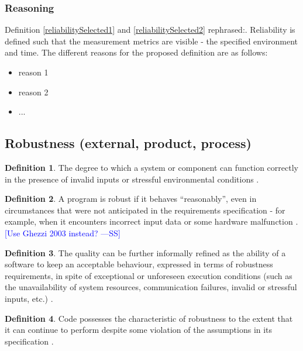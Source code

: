 \documentclass[letterpaper, cleveref]{lipics-v2019}
\newcommand{\authornote}[3]{\textcolor{#1}{[#3 ---#2]}}
\newcommand{\authornote}[3]{}
\newcommand{\wss}[1]{\authornote{blue}{SS}{#1}} %
\newcommand{\pmi}[1]{\authornote{green}{PM}{#1}} %
\theoremstyle{definition}
\newtheorem{defn}{Definition}
\begin{document}
\subsubsection*{Reasoning}

Definition \ref{reliabilitySelected1} and \ref{reliabilitySelected2} rephrased:.
Reliability is defined such that the measurement metrics are visible - the
specified environment and time.   The different reasons for the proposed
definition are as follows:

\begin{itemize}
  \item reason 1
  \item reason 2
  \item ...
\end{itemize}


\subsection{Robustness (external, product, process)} %

\begin{defn}
	The degree to which a system or component can function correctly in the
	presence of invalid inputs or stressful environmental conditions
	\citep{IEEEStdGlossarySET1990}.
\end{defn}

\begin{defn} \label{RobustnessDefnSelected}
	A program is robust if it behaves ``reasonably'', even in circumstances that
	were not anticipated in the requirements specification - for example, when it
	encounters incorrect input data or some hardware malfunction
	\citep{ghezzi1991fundamentals}. \wss{Use Ghezzi 2003 instead?}
\end{defn}

\begin{defn}
	The quality can be further informally refined as the ability of a software
  to keep an acceptable behaviour, expressed in terms of robustness
  requirements, in spite of exceptional or unforeseen execution conditions
  (such as the unavailability of system resources, communication failures,
  invalid or stressful inputs, etc.) \citep{fernandez2005model}.
\end{defn}

\begin{defn} \label{RobustnessPartialDefn}
	Code possesses the characteristic of robustness to the extent that it can
	continue to perform despite some violation of the assumptions in its 
	specification \citep{boehm2007software}.
\end{defn}
\end{document}
